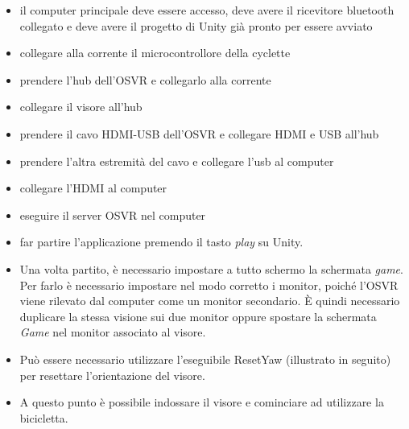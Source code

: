 \begin{itemize}
  \item il computer principale deve essere accesso, deve avere il ricevitore bluetooth collegato e deve avere il progetto di Unity già pronto per essere avviato
  \item collegare alla corrente il microcontrollore della cyclette
  \item prendere l'hub dell'OSVR e collegarlo alla corrente
  \item collegare il visore all'hub
  \item prendere il cavo HDMI-USB dell'OSVR e collegare HDMI e USB all'hub
  \item prendere l'altra estremità del cavo e collegare l'usb al computer
  \item collegare l'HDMI al computer
  \item eseguire il server OSVR nel computer
  \item far partire l'applicazione premendo il tasto \textit{play} su Unity.
  \item Una volta partito, è necessario impostare a tutto schermo la schermata \textit{game}. Per farlo è necessario impostare nel modo corretto i monitor, poiché l'OSVR viene rilevato dal computer come un monitor secondario. È quindi necessario duplicare la stessa visione sui due monitor oppure spostare la schermata \textit{Game} nel monitor associato al visore.
  \item Può essere necessario utilizzare l'eseguibile ResetYaw (illustrato in seguito) per resettare l'orientazione del visore.
  \item A questo punto è possibile indossare il visore e cominciare ad utilizzare la bicicletta.
\end{itemize}

\newpage
